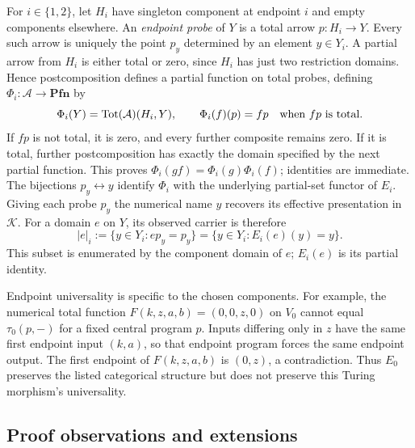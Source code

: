 \documentclass[11pt]{article}
\newcommand{\Pfn}{\mathbf{Pfn}}
\begin{document}
For $i\in\{1,2\}$, let $H_i$ have singleton component at endpoint $i$ and empty
components elsewhere. An \emph{endpoint probe} of $Y$ is a total
arrow $p:H_i\to Y$. Every such arrow is uniquely
the point $p_y$ determined by an element $y\in Y_i$. A partial
arrow from $H_i$ is either total or zero, since $H_i$ has just
two restriction domains. Hence postcomposition defines a partial
function on total probes, defining $\Phi_i:\mathcal A\to\Pfn$ by
\[
 \Phi_i(Y)=\operatorname{Tot}(\mathcal A)(H_i,Y),\qquad
 \Phi_i(f)(p)=fp\quad\hbox{when }fp\hbox{ is total}.
\]
If $fp$ is not total, it is zero, and every further composite
remains zero. If it is total, further postcomposition has exactly
the domain specified by the next partial function. This proves
$\Phi_i(gf)=\Phi_i(g)\Phi_i(f)$; identities are immediate.
The bijections $p_y\leftrightarrow y$ identify $\Phi_i$ with the
underlying partial-set functor of $E_i$. Giving each probe $p_y$
the numerical name $y$ recovers its effective presentation in
$\mathcal K$.
For a domain $e$ on $Y$, its observed carrier is therefore
\begin{equation}\label{eq:probe-domain}
 |e|_i:=\{y\in Y_i:ep_y=p_y\}
       =\{y\in Y_i:E_i(e)(y)=y\}.
\end{equation}
This subset is enumerated by the component domain of $e$;
$E_i(e)$ is its partial identity.

Endpoint universality is specific to the chosen components.
For example, the numerical total function
$F(k,z,a,b)=(0,0,z,0)$ on $V_0$ cannot equal
$\tau_0(p,-)$ for a fixed central program $p$.
Inputs differing only in $z$ have the same first endpoint input
$(k,a)$, so that endpoint program forces the same endpoint output.
The first endpoint of $F(k,z,a,b)$ is $(0,z)$, a contradiction.
Thus $E_0$ preserves the listed categorical structure but does
not preserve this Turing morphism's universality.

\subsection{Proof observations and extensions}
\end{document}
